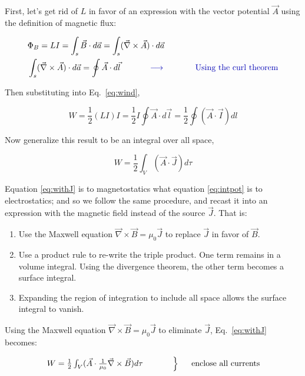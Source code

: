 \documentclass[12pt]{article}
\begin{document}
\begin{flushleft}
First, let's get rid of $L$ in favor of an expression with the vector potential $\vec{A}$ using the definition of magnetic flux:

\begin{equation*}
\begin{aligned}
& \Phi_{B}= LI = \int_{s} \vec{B} \cdot d\vec{a} = \int_{s} (\vec{\nabla} \times \vec{A} ) \cdot d\vec{a} \\
& \int_{s} (\vec{\nabla} \times \vec{A} ) \cdot d\vec{a} = \oint \vec{A} \cdot d\vec{l} \hspace{.5in} {\color{myblue} \longrightarrow \hspace{.5in} \text{Using the curl theorem}}
\end{aligned}
\end{equation*}

Then substituting into Eq.~\ref{eq:wind},

\begin{equation*}
W=\frac{1}{2} (LI) I = \frac{1}{2} I \oint \vec{A} \cdot d\vec{l} = \frac{1}{2} \oint (\vec{A} \cdot \vec{I} ) dl
\end{equation*}

Now generalize this result to be an integral over all space,

\begin{equation}
W =\frac{1}{2} \int_{V} (\vec{A} \cdot \vec{J} ) d\tau
\label{eq:withJ}
\end{equation}
 
Equation \ref{eq:withJ} is to magnetostatics what equation \ref{eq:intpot} is to electrostatics; and so we follow the same procedure, and recast it into an expression with the magnetic field instead of the source $\vec{J}$.  That is:
\begin{enumerate}
\item Use the Maxwell equation $\vec{\nabla} \times \vec{B} = \mu_{0}\vec{J}$ to replace $\vec{J}$ in favor of $\vec{B}$.
\item Use a product rule to re-write the triple product.  One term remains in a volume integral.  Using the divergence theorem, the other term becomes a surface integral. 
\item Expanding the region of integration to include all space allows the surface integral to vanish.
\end{enumerate}
 
Using the Maxwell equation $\vec{\nabla} \times \vec{B} = \mu_{0}\vec{J}$ to eliminate $\vec{J}$, Eq.~\ref{eq:withJ} becomes:

\begin{equation}
\begin{rcases}
W =\frac{1}{2} \int_{V} (\vec{A} \cdot \frac{1}{\mu_{0}}\vec{\nabla} \times \vec{B} ) d\tau
\hspace{.5in}
\end{rcases}
\hspace{.2in} \text{enclose all currents}
\label{eq:ABenergy}
\end{equation}


\end{flushleft}
\end{document}
